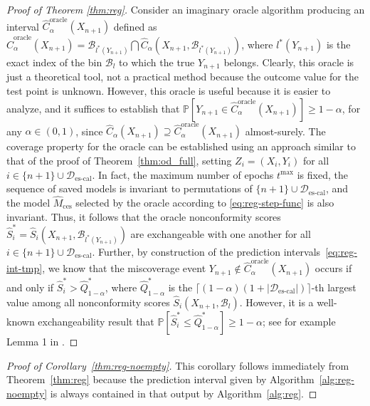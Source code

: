 \begin{proof}[Proof of Theorem \ref{thm:reg}]
Consider an imaginary oracle algorithm producing an interval $\hat{C}^{\text{oracle}}_{\alpha}(X_{n+1})$ defined as $\hat{C}^{\text{oracle}}_{\alpha}(X_{n+1}) = \mathcal{B}_{l^*(Y_{n+1})} \bigcap \hat{C}_{\alpha}(X_{n+1}, \mathcal{B}_{l^*(Y_{n+1})})$, where $l^*(Y_{n+1})$ is the exact index of the bin $\mathcal{B}_l$ to which the true $Y_{n+1}$ belongs. Clearly, this oracle is just a theoretical tool, not a practical method because the outcome value for the test point is unknown.
However, this oracle is useful because it is easier to analyze, and it suffices to establish that $\mathbb{P}[Y_{n+1} \in \hat{C}^{\text{oracle}}_{\alpha}(X_{n+1})] \geq 1-\alpha$, for any $\alpha \in (0,1)$, since $\hat{C}_{\alpha}(X_{n+1}) \supseteq \hat{C}^{\text{oracle}}_{\alpha}(X_{n+1})$ almost-surely.
The coverage property for the oracle can be established using an approach similar to that of the proof of Theorem~\ref{thm:od_full}, setting $Z_i=(X_i,Y_i)$ for all $i \in \{n+1\} \cup \mathcal{D}_{\text{es-cal}}$.
In fact, the maximum number of epochs $t^{\text{max}}$ is fixed, the sequence of saved models is invariant to permutations of $\{n+1\} \cup \mathcal{D}_{\text{es-cal}}$, and the  model $\hat{M}_{\text{ces}}$ selected by the oracle according to \eqref{eq:reg-step-func} is also invariant.
Thus, it follows that the oracle nonconformity scores $\hat{S}_i^* = \hat{S}_i(X_{n+1}, \mathcal{B}_{l^*(Y_{n+1})})$ are exchangeable with one another for all $i \in \{n+1\} \cup \mathcal{D}_{\text{es-cal}}$.
Further, by construction of the prediction intervals~\eqref{eq:reg-int-tmp}, we know that the miscoverage event $Y_{n+1} \not\in \hat{C}^{\text{oracle}}_{\alpha}(X_{n+1})$ occurs if and only if $\hat{S}^*_i > \hat{Q}^*_{1-\alpha}$, where $\hat{Q}^*_{1-\alpha}$ is the $\lceil (1-\alpha)(1+|\mathcal{D}_{\text{es-cal}}|) \rceil$-th largest value among all nonconformity scores $\hat{S}_i(X_{n+1},\mathcal{B}_l)$.
However, it is a well-known exchangeability result that $\mathbb{P}[\hat{S}^*_i \leq \hat{Q}^*_{1-\alpha}] \geq 1-\alpha$; see for example Lemma 1 in \citet{romano2019conformalized}.
\end{proof}

\begin{proof}[Proof of Corollary~\ref{thm:reg-noempty}]
This corollary follows immediately from Theorem~\ref{thm:reg} because the prediction interval given by Algorithm~\ref{alg:reg-noempty} is always contained in that output by Algorithm~\ref{alg:reg}.
\end{proof}


